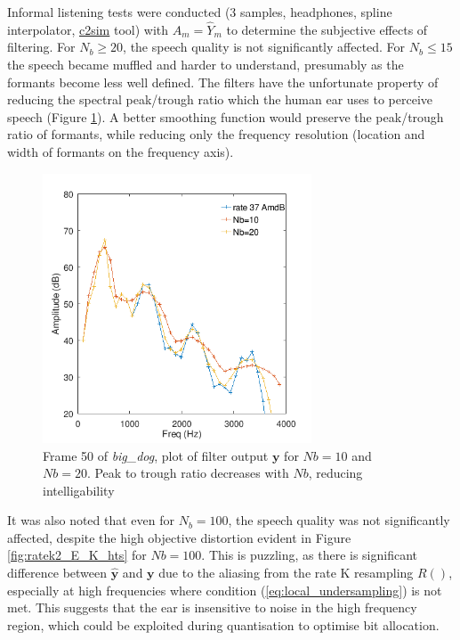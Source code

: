 \documentclass{article}
\begin{document}
Informal listening tests were conducted (3 samples, headphones, spline interpolator, \url{c2sim} tool) with $A_m={\hat{Y}_m}$ to determine the subjective effects of filtering. For $N_b \geq 20$, the speech quality is not significantly affected.  For $N_b \leq 15$ the speech became muffled and harder to understand, presumably as the formants become less well defined.  The filters have the unfortunate property of reducing the spectral peak/trough ratio which the human ear uses to perceive speech (Figure \ref{fig:ratek2_nb_big_dog_50}).  A better smoothing function would preserve the peak/trough ratio of formants, while reducing only the frequency resolution (location and width of formants on the frequency axis). 

\begin{figure}[h]
\caption{Frame 50 of \emph{big\_dog}, plot of filter output $\mathbf{y}$ for $Nb=10$ and $Nb=20$.  Peak to trough ratio decreases with $Nb$, reducing intelligability}
\label{fig:ratek2_nb_big_dog_50}
\begin{center}
\includegraphics[width=8cm]{ratek2_nb_big_dog_50.png}
\end{center}
\end{figure}

It was also noted that even for $N_b=100$, the speech quality was not significantly affected, despite the high objective distortion evident in Figure \ref{fig:ratek2_E_K_hts} for $Nb=100$.  This is puzzling, as there is significant difference between $\hat{\mathbf{y}}$ and $\mathbf{y}$ due to the aliasing from the rate K resampling $R()$, especially at high frequencies where condition (\ref{eq:local_undersampling}) is not met.  This suggests that the ear is insensitive to noise in the high frequency region, which could be exploited during quantisation to optimise bit allocation.
\end{document}
